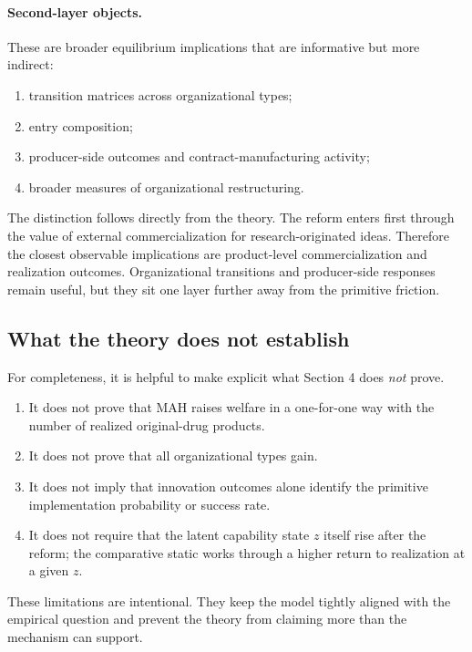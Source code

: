 \documentclass[12pt]{article}
\begin{document}
\paragraph{Second-layer objects.}
These are broader equilibrium implications that are informative but more indirect:
\begin{enumerate}[label=(\roman*),leftmargin=2em]
    \item transition matrices across organizational types;
    \item entry composition;
    \item producer-side outcomes and contract-manufacturing activity;
    \item broader measures of organizational restructuring.
\end{enumerate}

The distinction follows directly from the theory. The reform enters first through the value of external commercialization for research-originated ideas. Therefore the closest observable implications are product-level commercialization and realization outcomes. Organizational transitions and producer-side responses remain useful, but they sit one layer further away from the primitive friction.

\subsection{What the theory does not establish}

For completeness, it is helpful to make explicit what Section 4 does \emph{not} prove.

\begin{enumerate}[label=(\roman*),leftmargin=2em]
    \item It does not prove that MAH raises welfare in a one-for-one way with the number of realized original-drug products.
    \item It does not prove that all organizational types gain.
    \item It does not imply that innovation outcomes alone identify the primitive implementation probability or success rate.
    \item It does not require that the latent capability state \(z\) itself rise after the reform; the comparative static works through a higher return to realization at a given \(z\).
\end{enumerate}

These limitations are intentional. They keep the model tightly aligned with the empirical question and prevent the theory from claiming more than the mechanism can support.
\end{document}
